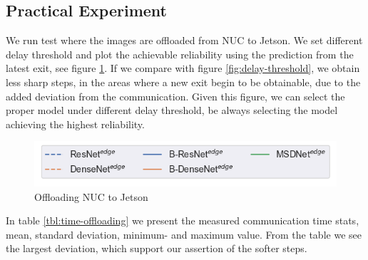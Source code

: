 \subsection{Practical Experiment}

We run test where the images are offloaded from NUC to Jetson. We set different delay threshold and plot the achievable reliability using the prediction from the latest exit, see figure \ref{fig:practical-offloading}. If we compare with figure \ref{fig:delay-threshold}, we obtain less sharp steps, in the areas where a new exit begin to be obtainable, due to the added deviation from the communication. Given this figure, we can select the proper model under different delay threshold, be always selecting the model achieving the highest reliability.  

\begin{figure}
	\captionsetup[subfigure]{justification=centering,farskip=1pt,captionskip=1pt}
	\centering
	\includegraphics[width=.5\linewidth]{figures/edge/offloading_legend}
	\hfill
	\caption[Offloading NUC to Jetson]{Offloading NUC to Jetson}
	\label{fig:practical-offloading}
\end{figure}

In table \ref{tbl:time-offloading} we present the measured communication time stats, mean, standard deviation, minimum- and maximum value. From the table we see the largest deviation, which support our assertion of the softer steps.  

